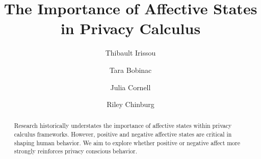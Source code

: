 \documentclass[acmtog]{acmart}
\begin{document}
\title{The Importance of Affective States in Privacy Calculus}

\author{Thibault Irissou}

\author{Tara Bobinac}

\author{Julia Cornell}

\author{Riley Chinburg}

\graphicspath{ {../images/} }


\renewcommand{\shortauthors}{Irissou, Bobinac, Chinburg, and Cornell}

\begin{abstract}
    Research historically understates the importance of affective states within privacy calculus frameworks. However, positive and negative affective states are critical in shaping human behavior. We aim to explore whether positive or negative affect more strongly reinforces privacy conscious behavior.
\end{abstract}
\end{document}
